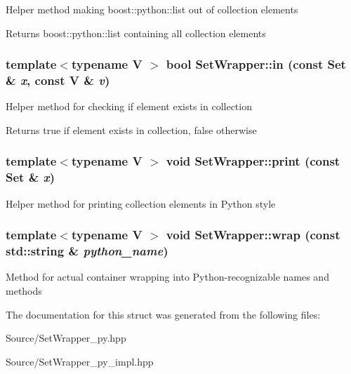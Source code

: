\label{struct_stl_containers_wrappers_1_1_set_wrapper_a1beec5bd4543b5f175ae95877a1844b8}
Helper method making boost::python::list out of collection elements \begin{DoxyReturn}{Returns}
boost::python::list containing all collection elements 
\end{DoxyReturn}
\hypertarget{struct_stl_containers_wrappers_1_1_set_wrapper_a1962f5a329a40cb328e60971ee99e0be}{
\subsubsection[{in}]{\setlength{\rightskip}{0pt plus 5cm}template$<$typename V $>$ bool SetWrapper::in (const Set \& {\em x}, \/  const V \& {\em v})}}
\label{struct_stl_containers_wrappers_1_1_set_wrapper_a1962f5a329a40cb328e60971ee99e0be}
Helper method for checking if element exists in collection \begin{DoxyReturn}{Returns}
true if element exists in collection, false otherwise 
\end{DoxyReturn}
\hypertarget{struct_stl_containers_wrappers_1_1_set_wrapper_a3f90e1e6b44e90abe44c63c3f323c93c}{
\subsubsection[{print}]{\setlength{\rightskip}{0pt plus 5cm}template$<$typename V $>$ void SetWrapper::print (const Set \& {\em x})}}
\label{struct_stl_containers_wrappers_1_1_set_wrapper_a3f90e1e6b44e90abe44c63c3f323c93c}
Helper method for printing collection elements in Python style \hypertarget{struct_stl_containers_wrappers_1_1_set_wrapper_aec5cc7bb0b7c14f8196571c5fd81d137}{
\subsubsection[{wrap}]{\setlength{\rightskip}{0pt plus 5cm}template$<$typename V $>$ void SetWrapper::wrap (const std::string \& {\em python\_\-name})}}
\label{struct_stl_containers_wrappers_1_1_set_wrapper_aec5cc7bb0b7c14f8196571c5fd81d137}
Method for actual container wrapping into Python-\/recognizable names and methods 

The documentation for this struct was generated from the following files:\begin{DoxyCompactItemize}
\item 
Source/SetWrapper\_\-py.hpp\item 
Source/SetWrapper\_\-py\_\-impl.hpp\end{DoxyCompactItemize}

